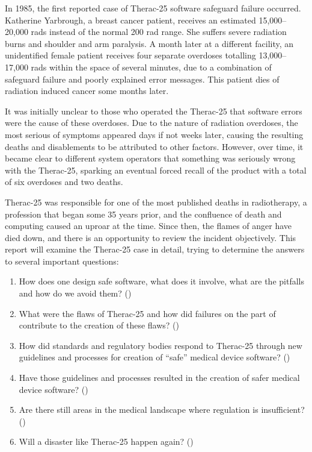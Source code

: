 \documentclass{cshonours}
\newcommand{\ther}{Therac-25\xspace}
\begin{document}
In 1985, the first reported case of \ther software safeguard failure occurred. Katherine Yarbrough, a breast cancer patient, receives an estimated 15,000--20,000 rads instead of the normal 200 rad range. She suffers severe radiation burns and shoulder and arm paralysis. A month later at a different facility, an unidentified female patient receives four separate overdoses totalling 13,000--17,000 rads within the space of several minutes, due to a combination of safeguard failure and poorly explained error messages. This patient dies of radiation induced cancer some months later.

It was initially unclear to those who operated the \ther that software errors were the cause of these overdoses. Due to the nature of radiation overdoses, the most serious of symptoms appeared days if not weeks later, causing the resulting deaths and disablements to be attributed to other factors. However, over time, it became clear to different system operators that something was seriously wrong with the \ther, sparking an eventual forced \fda recall of the product with a total of six overdoses and two deaths.

\ther was responsible for one of the most published deaths in radiotherapy, a profession that began some 35 years prior, and the confluence of death and computing caused an uproar at the time. Since then, the flames of anger have died down, and there is an opportunity to review the incident objectively. This report will examine the \ther case in detail, trying to determine the answers to several important questions:
\begin{enumerate}
 \item How does one design safe software, what does it involve, what are the pitfalls and how do we avoid them? ()
 \item What were the flaws of \ther and how did failures on the part of \aecl contribute to the creation of these flaws? ()
 \item How did standards and regulatory bodies respond to \ther through new guidelines and processes for creation of ``safe'' medical device software? ()
 \item Have those guidelines and processes resulted in the creation of safer medical device software? () 
 \item Are there still areas in the medical landscape where regulation is insufficient? ()
 \item Will a disaster like \ther happen again? ()
\end{enumerate}
\end{document}
